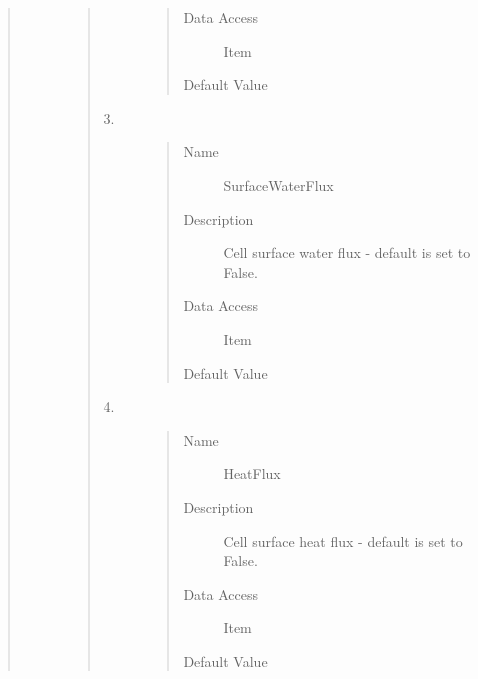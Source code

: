 \documentclass[letterpaper,10pt,english]{sphinxmanual}
\begin{document}
\begin{quote}
\begin{description}
\begin{quote}
\begin{description}
\begin{quote}
\begin{description}
\item[{Data Access}] \leavevmode
Item

\item[{Default Value}] \leavevmode
{}

\end{description}\end{quote}

\item[{3.}] \leavevmode\begin{quote}\begin{description}
\item[{Name}] \leavevmode
SurfaceWaterFlux

\item[{Description}] \leavevmode
Cell surface water flux - default is set to False.

\item[{Data Access}] \leavevmode
Item

\item[{Default Value}] \leavevmode
{}

\end{description}\end{quote}

\item[{4.}] \leavevmode\begin{quote}\begin{description}
\item[{Name}] \leavevmode
HeatFlux

\item[{Description}] \leavevmode
Cell surface heat flux - default is set to False.

\item[{Data Access}] \leavevmode
Item

\item[{Default Value}] \leavevmode
{}

\end{description}\end{quote}


\end{description}
\end{quote}
\end{description}
\end{quote}
\end{document}
